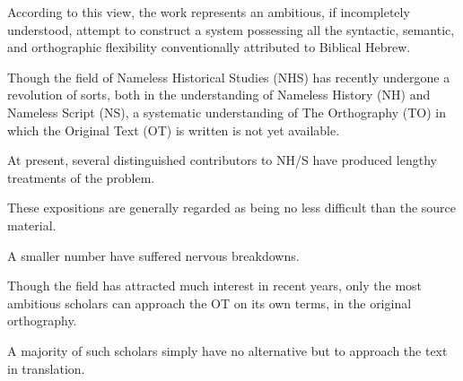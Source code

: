 {{\begin{together}
{        According to this view, the work represents an ambitious, if incompletely understood,
            attempt to construct a system possessing all the syntactic, semantic,
            and orthographic flexibility conventionally attributed to Biblical Hebrew.

        Though the field of Nameless Historical Studies (NHS) has recently undergone a revolution of sorts,
            both in the understanding of Nameless History (NH) and Nameless Script (NS),
            a systematic understanding of The Orthography (TO) in which the Original Text (OT)
            is written is not yet available.

        At present, several distinguished contributors to NH/S have produced lengthy treatments of the problem.

        These expositions are generally regarded as being no less difficult than the source material.

        A smaller number have suffered nervous breakdowns.

        Though the field has attracted much interest in recent years, only the most ambitious
            scholars can approach the OT on its own terms, in the original orthography.

        A majority of such scholars simply have no alternative but to approach the text in translation.
    }

    \end{together}

}

}

{
}
{
}
{
}

{
}
{
}
{
}

{
}
{
}
{
}


